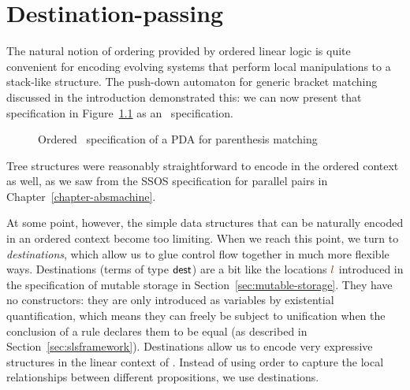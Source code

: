 \chapter{Destination-passing}
\label{chapter-destinations}

The natural notion of ordering provided by ordered linear logic is
quite convenient for encoding evolving systems that perform local
manipulations to a stack-like structure.  The push-down
automaton for generic bracket matching discussed in the introduction
demonstrated this: we can now present that specification in
Figure~\ref{fig:pda-ord} as an \sls~specification.

\begin{figure}[ht]
\caption{Ordered \sls~specification of a PDA for parenthesis matching}
\label{fig:pda-ord}
\end{figure}

\noindent
Tree structures were reasonably straightforward to encode in the
ordered context as well, as we saw from the SSOS specification for
parallel pairs in Chapter~\ref{chapter-absmachine}. 

At some point, however, the simple data structures that can be
naturally encoded in an ordered context become too limiting. When we
reach this point, we turn to {\it destinations}, which allow us to
glue control flow together in much more flexible ways. Destinations
(terms of type ${\sf dest}$) are a bit like the locations $\lf l$
introduced in the specification of mutable storage in
Section~\ref{sec:mutable-storage}. They have no constructors: they are
only introduced as variables by existential quantification, which
means they can freely be subject to unification when the conclusion of
a rule declares them to be equal (as described in
Section~\ref{sec:slsframework}). Destinations allow us to encode very
expressive structures in the linear context of \sls. Instead of using
order to capture the local relationships between different
propositions, we use destinations.

